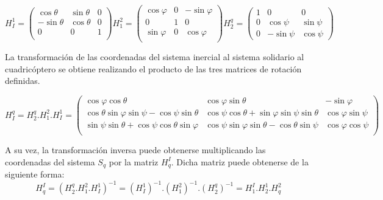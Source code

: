 \documentclass[main]{subfiles}
\begin{document}
\begin{equation}
\label{eq:bases}
H_I^1=\left(\begin{array}{ccc}
  \cos\theta&\sin\theta&0\\
  -\sin\theta&\cos\theta&0\\
  0&0&1\\
  \end{array}\right)   H_1^2=\left(\begin{array}{ccc}
  \cos\varphi&0& -\sin\varphi\\
  0&1&0\\
  \sin\varphi&0&\cos\varphi\\
  
  \end{array}\right)  H_2^q=\left(\begin{array}{ccc}
   1&0&0\\  
  0&\cos\psi&\sin\psi\\
  0&-\sin\psi&\cos\psi  
  
  \end{array}\right) 
\end{equation}



La transformaci\'on de las coordenadas del sistema inercial al sistema solidario al cuadric\'optero se obtiene realizando el producto de las tres matrices de rotaci\'on definidas.

\begin{footnotesize}
\begin{equation}
\label{eq:cambio_base}
H_I^q=H_2^q.H_1^2.H_I^1=\left(\begin{array}{ccc}
\cos\varphi\cos\theta& \cos\varphi\sin\theta& -\sin\varphi\\
 \cos\theta\sin\varphi\sin\psi -\cos\psi\sin\theta &\cos \psi \cos \theta+ \sin\varphi\sin\psi\sin\theta& \cos\varphi\sin\psi\\
\sin\psi\sin\theta + \cos\psi\cos\theta\sin\varphi&  \cos\psi\sin\varphi\sin\theta- \cos\theta\sin\psi & \cos\varphi\cos\psi\\
\end{array} \right)
\end{equation}
\end{footnotesize}
 
 A su vez, la transformaci\'on inversa puede obtenerse multiplicando las coordenadas del sistema $S_q$ por la matriz $H_q^I$. Dicha matriz puede obtenerse de la siguiente forma:
\begin{equation}
 H_q^I=(H_2^q.H_1^2.H_I^1)^{-1}=(H_I^1)^{-1}.(H_1^2)^{-1}.(H_2^q)^{-1}=H_1^I.H_2^1.H_q^2
 \end{equation}
 
\end{document}
